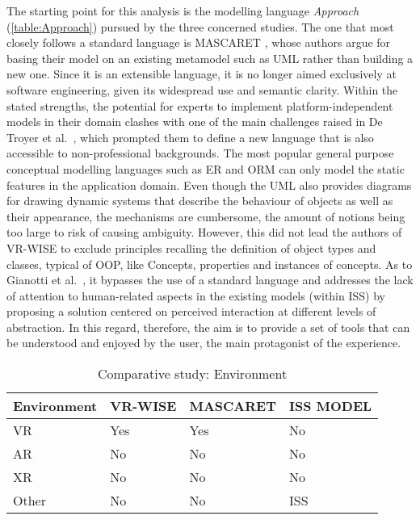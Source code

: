 The starting point for this analysis is the modelling language \textit{Approach} (\autoref{table:Approach}) pursued by the three concerned studies. The one that most closely follows a standard language is MASCARET \cite{chevaillier_semantic_2012}, whose authors argue for basing their model on an existing metamodel such as UML \cite{fowler_uml_2000} rather than building a new one. Since it is an extensible language, it is no longer aimed exclusively at software engineering, given its widespread use and semantic clarity. Within the stated strengths, the potential for experts to implement platform-independent models in their domain clashes with one of the main challenges raised in De Troyer et al.~\cite{de_troyer_conceptual_2007}, which prompted them to define a new language that is also accessible to non-professional backgrounds. 
The most popular general purpose conceptual modelling languages such as ER \cite{chen_context-aware_2019} and ORM \cite{halpin_conceptual_1995} can only model the static features in the application domain. Even though the UML also provides diagrams for drawing dynamic systems that describe the behaviour of objects as well as their appearance, the mechanisms are cumbersome, the amount of notions being too large to risk of causing ambiguity. However, this did not lead the authors of VR-WISE to exclude principles recalling the definition of object types and classes, typical of OOP, like Concepts, properties and instances of concepts. 
As to Gianotti et al.~\cite{dobbie_modeling_2020}, it bypasses the use of a standard language and addresses the lack of attention to human-related aspects in the existing models (within ISS) by proposing a solution centered on perceived interaction at different levels of abstraction. In this regard, therefore, the aim is to provide a set of tools that can be understood and enjoyed by the user, the main protagonist of the experience. 

\begin{table}
\begin{tabular}{|p{2.5cm}|p{3cm}|p{3cm}|p{3cm}|} 
\hline %
\textbf{Environment}
& \textbf{VR-WISE} 
& \textbf{MASCARET}
& \textbf{ISS MODEL} \\ 
\hline
VR
& Yes
& Yes
& No\\ 
\hline
AR
& No
& No
& No\\ 
\hline
XR
& No
& No
& No\\ 
\hline
Other
& No
& No
& ISS\\ 
\hline
\end{tabular} 
\caption{Comparative study: Environment}
\label{table:Environment}
\end{table}


